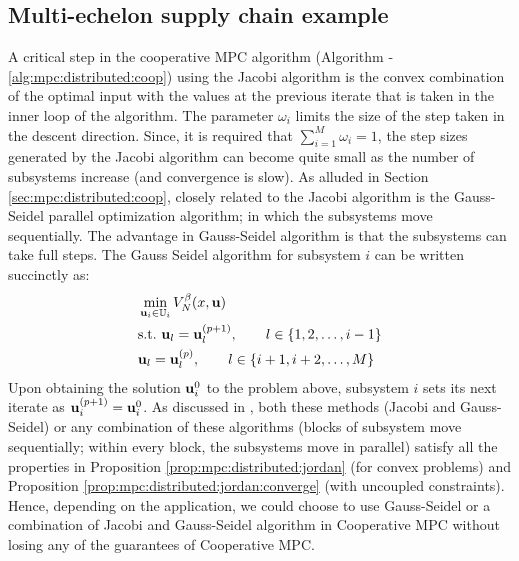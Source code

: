 \subsection{Multi-echelon supply chain example}
\label{sec:sc:supplychain_example:lssc}
A critical step in the cooperative MPC algorithm (Algorithm -\ref{alg:mpc:distributed:coop})
using the Jacobi algorithm is the convex combination of the optimal
input with the values at the previous iterate that is taken in the
inner loop of the algorithm. The parameter $\omega_i$ limits the size
of the step taken in the descent direction. Since, it is required
that $\sum_{i=1}^{M} \omega_i=1$, the step sizes generated by the
Jacobi algorithm can become quite small as the number of subsystems
increase (and convergence is slow). As alluded in Section
\ref{sec:mpc:distributed:coop}, closely related to the Jacobi
algorithm is the Gauss-Seidel parallel optimization algorithm; in
which the subsystems move sequentially. The advantage in Gauss-Seidel
algorithm is that the subsystems can take full steps. The 
Gauss Seidel algorithm for subsystem $i$ can be written succinctly as:
\begin{align*}
 &\min_{\mathbf{u}_i \in \mathbb{U}_i} V_N^\beta(x,\mathbf{u}) \\
 &\text{s.t.~} \mathbf{u}_l = \mathbf{u}_l^{(p+1)}, \qquad l \in \left\lbrace 1,2,\ldots,i-1 \right\rbrace\\
 &\mathbf{u}_l = \mathbf{u}_l^{(p)}, \qquad l \in \left\lbrace i+1,i+2,\ldots,M \right\rbrace\\
\end{align*}
Upon obtaining the solution $\mathbf{u}_i^0$ to the problem above, subsystem
$i$ sets its next iterate as $\mathbf{u}_i^{(p+1)} = \mathbf{u}_i^0$. As discussed in
  \citet[Section 3.3.5]{bertsekas:tsitsiklis:1989}, both these methods (Jacobi
and Gauss-Seidel) or any combination of these algorithms (blocks of
subsystem move sequentially; within every block, the subsystems move
in parallel) satisfy all the properties in Proposition
\ref{prop:mpc:distributed:jordan} (for convex problems) and Proposition
\ref{prop:mpc:distributed:jordan:converge} (with uncoupled
constraints). Hence, depending on the application, we could choose to
use Gauss-Seidel or a combination of Jacobi and Gauss-Seidel algorithm
in Cooperative MPC without losing any of the guarantees of Cooperative
MPC.

